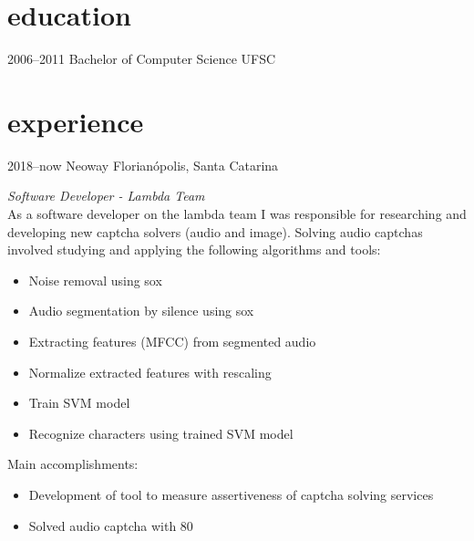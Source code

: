 \documentclass[]{friggeri-cv} %
\begin{document}

\section{education}

\begin{entrylist}
\entry
{2006--2011}
{Bachelor of Computer Science}
{UFSC}
{}
\end{entrylist}


\section{experience}

\begin{entrylist}
\entry
{2018--now}
{Neoway}
{Florianópolis, Santa Catarina}
{\emph{Software Developer - Lambda Team} \\

    As a software developer on the lambda team I was responsible for researching
    and developing new captcha solvers (audio and image). Solving audio captchas involved
    studying and applying the following algorithms and tools:

\begin{itemize}
    \item Noise removal using sox
    \item Audio segmentation by silence using sox
    \item Extracting features (MFCC) from segmented audio
    \item Normalize extracted features with rescaling
    \item Train SVM model
    \item Recognize characters using trained SVM model
\end{itemize}

Main accomplishments:\\

\begin{itemize}
	\item Development of tool to measure assertiveness of captcha solving services
    \item Solved audio captcha with 80%
\end{itemize}


}
\end{entrylist}
\end{document}
